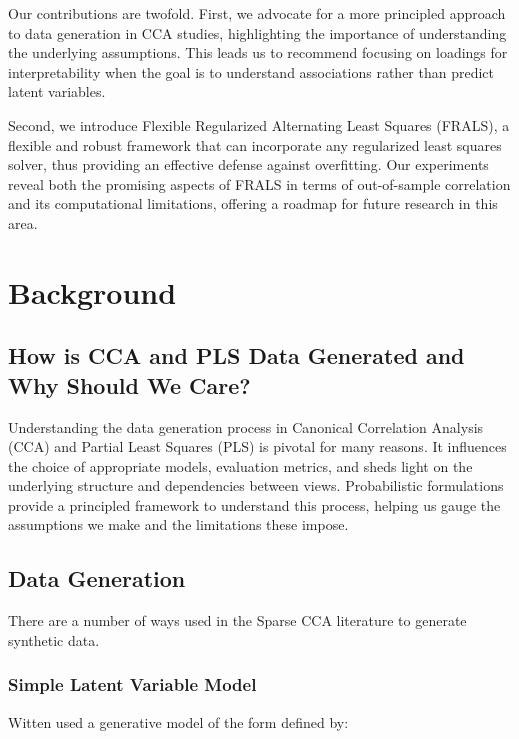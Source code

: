 Our contributions are twofold. First, we advocate for a more principled approach to data generation in CCA studies, highlighting the importance of understanding the underlying assumptions. This leads us to recommend focusing on loadings for interpretability when the goal is to understand associations rather than predict latent variables. 

Second, we introduce Flexible Regularized Alternating Least Squares (FRALS), a flexible and robust framework that can incorporate any regularized least squares solver, thus providing an effective defense against overfitting. Our experiments reveal both the promising aspects of FRALS in terms of out-of-sample correlation and its computational limitations, offering a roadmap for future research in this area.


\section{Background}\label{sec:background}

\subsection{How is CCA and PLS Data Generated and Why Should We Care?}\label{sec:how-is-cca-and-pls-data-generated-and
-why-should-we-care?}

Understanding the data generation process in Canonical Correlation Analysis (CCA) and Partial Least Squares (PLS) is pivotal for many reasons. It influences the choice of appropriate models, evaluation metrics, and sheds light on the underlying structure and dependencies between views. Probabilistic formulations provide a principled framework to understand this process, helping us gauge the assumptions we make and the limitations these impose.


\subsection{Data Generation}\label{subsec:data-generation-background}

There are a number of ways used in the Sparse CCA literature to generate synthetic data.

\subsubsection{Simple Latent Variable Model}

Witten\cite{witten2009extensions} used a generative model of the form defined by:

